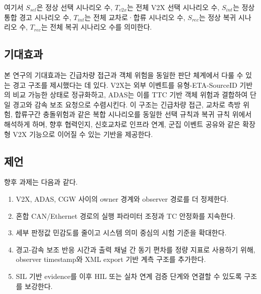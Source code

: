 \documentclass[10pt,a4paper,twocolumn]{article}
\begin{document}
\noindent\footnotesize 여기서 $S_{sel}$은 정상 선택 시나리오 수, $T_{v2x}$는 전체 V2X 선택 시나리오 수, $S_{int}$는 정상 통합 경고 시나리오 수, $T_{int}$는 전체 교차로·합류 시나리오 수, $S_{rec}$는 정상 복귀 시나리오 수, $T_{rec}$는 전체 복귀 시나리오 수를 의미한다.\normalsize

\subsection{기대효과}

본 연구의 기대효과는 긴급차량 접근과 객체 위험을 동일한 판단 체계에서 다룰 수 있는 경고 구조를 제시했다는 데 있다. V2X는 외부 이벤트를 유형-ETA-SourceID 기반의 비교 가능한 상태로 정규화하고, ADAS는 이를 TTC 기반 객체 위험과 결합하여 단일 경고와 감속 보조 요청으로 수렴시킨다. 이 구조는 긴급차량 접근, 교차로 측방 위험, 합류구간 충돌위험과 같은 복합 시나리오를 동일한 선택 규칙과 복귀 규칙 위에서 해석하게 하며, 향후 협력인지, 신호교차로 인프라 연계, 군집 이벤트 공유와 같은 확장형 V2X 기능으로 이어질 수 있는 기반을 제공한다.

\subsection{제언}

향후 과제는 다음과 같다.

\begin{enumerate}[label=\arabic*.]
\item V2X, ADAS, CGW 사이의 owner 경계와 observer 경로를 더 정제한다.
\item 혼합 CAN/Ethernet 경로의 실행 파라미터 조정과 TC 안정화를 지속한다.
\item 세부 판정값 민감도를 줄이고 시스템 의미 중심의 시험 기준을 확대한다.
\item 경고-감속 보조 반응 시간과 출력 채널 간 동기 편차를 정량 지표로 사용하기 위해, observer timestamp와 XML export 기반 계측 구조를 추가한다.
\item SIL 기반 evidence를 이후 HIL 또는 실차 연계 검증 단계와 연결할 수 있도록 구조를 보강한다.
\end{enumerate}
\end{document}
